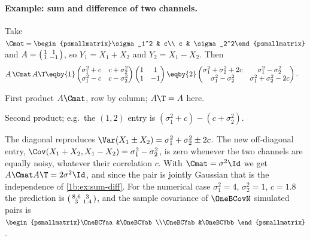 \paragraph{Example: sum and difference of two channels.}
Take $\Cmat=\begin{psmallmatrix}\sigma_1^2 & c\\ c & \sigma_2^2\end{psmallmatrix}$
and $A=\begin{psmallmatrix}1&1\\1&-1\end{psmallmatrix}$, so
$Y_1=X_1+X_2$ and $Y_2=X_1-X_2$. Then
\begin{align*}
  A\,\Cmat\,A\T
  &\eqby{1} \begin{pmatrix}\sigma_1^2+c & c+\sigma_2^2\\ \sigma_1^2-c & c-\sigma_2^2\end{pmatrix}
            \begin{pmatrix}1&1\\1&-1\end{pmatrix}
   \eqby{2} \begin{pmatrix}\sigma_1^2+\sigma_2^2+2c & \sigma_1^2-\sigma_2^2\\
                           \sigma_1^2-\sigma_2^2 & \sigma_1^2+\sigma_2^2-2c\end{pmatrix}.
\end{align*}
\begin{explain}
  \item First product $A\Cmat$, row by column; $A\T=A$ here.
  \item Second product; e.g.\ the $(1,2)$ entry is
        $(\sigma_1^2+c)-(c+\sigma_2^2)$.
\end{explain}
The diagonal reproduces $\Var(X_1\pm X_2)=\sigma_1^2+\sigma_2^2\pm2c$. The new
off-diagonal entry, $\Cov(X_1+X_2,X_1-X_2)=\sigma_1^2-\sigma_2^2$, is zero
whenever the two channels are equally noisy, whatever their correlation $c$.
With $\Cmat=\sigma^2\Id$ we get $A\Cmat A\T=2\sigma^2\Id$, and since the pair is
jointly Gaussian that is the independence of \cref{1b:ex:sum-diff}. For
the numerical case $\sigma_1^2=4$, $\sigma_2^2=1$, $c=1.8$ the prediction is
$\begin{psmallmatrix}8.6&3\\3&1.4\end{psmallmatrix}$, and the sample covariance
of $\OneBCovN$ simulated pairs is
$\begin{psmallmatrix}\OneBCYaa&\OneBCYab\\\OneBCYab&\OneBCYbb\end{psmallmatrix}$.

